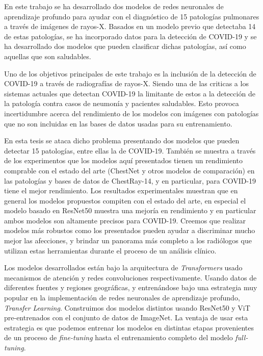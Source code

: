 En este trabajo se ha desarrollado dos modelos de redes neuronales de aprendizaje profundo para ayudar
con el diagnóstico de 15 patologías pulmonares a través de imágenes de rayos-X.
Basados en un modelo previo que detectaba 14 de estas
patologías, se ha incorporado datos para la detección de COVID-19 y se ha desarrollado dos modelos
que pueden clasificar dichas patologías, así como aquellas que son saludables.

Uno de los objetivos principales de este trabajo es la inclusión de la detección de COVID-19 a través
de radiografías de rayos-X. Siendo una de las criticas a los sistemas actuales que detectan COVID-19
la limitante de estos a la detección de la patología contra casos de neumonía y pacientes saludables.
Esto provoca incertidumbre acerca del rendimiento de los modelos con imágenes con patologías que no son
incluidas en las bases de datos usadas para su entrenamiento.

En esta tesis se ataca dicho problema presentando dos modelos que pueden detectar 15 patologías, entre
ellas la de COVID-19. También se muestra a través de los experimentos que los modelos aquí presentados
tienen un rendimiento comprable con el estado del arte (ChestNet y otros modelos de comparación) en las
patologías y bases de datos de ChestRay-14, y en particular, para COVID-19 tiene el mejor rendimiento.
Los resultados experimentales muestran que en general los modelos propuestos compiten con el estado
del arte, en especial el modelo basado en ResNet50 muestra una mejoría en rendimiento y en
particular ambos modelos son altamente precisos para COVID-19. Creemos que realizar modelos más
robustos como los presentados pueden ayudar a discriminar mucho mejor
las afecciones, y brindar un panorama más completo a los radiólogos que utilizan estas
herramientas durante el proceso de un análisis clínico.

Los modelos desarrollados están bajo la arquitectura de \textit{Transformers} usado mecanismos de atención
y redes convoluciones respectivamente. Usando datos de diferentes fuentes y regiones geográficas, y
entrenándose bajo una estrategia muy popular en la implementación de redes neuronales de aprendizaje
profundo, \textit{Transfer Learning}. Construimos dos modelos distintos usando ResNet50 y ViT
pre-entrenados con el conjunto de datos de ImageNet. La ventaja de usar esta estrategia es que podemos
entrenar los modelos en distintas etapas provenientes de un proceso de \textit{fine-tuning} hasta el
entrenamiento completo del modelo \textit{full-tuning}.

